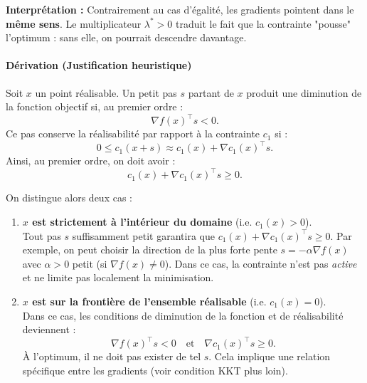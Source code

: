 \begin{figureexplanation}
\textbf{Interprétation :} Contrairement au cas d'égalité, les gradients pointent dans le \textbf{même sens}. Le multiplicateur $\lambda^* > 0$ traduit le fait que la contrainte "pousse" l'optimum : sans elle, on pourrait descendre davantage.
\end{figureexplanation}

\paragraph{Dérivation (Justification heuristique)}
Soit $x$ un point réalisable.
Un petit pas $s$ partant de $x$ produit une diminution de la fonction objectif si, au premier ordre :
\begin{equation}
    \nabla f(x)^\top s < 0.
\end{equation}
Ce pas conserve la réalisabilité par rapport à la contrainte $c_1$ si :
\begin{equation}
    0 \le c_1(x+s) \approx c_1(x) + \nabla c_1(x)^\top s.
\end{equation}
Ainsi, au premier ordre, on doit avoir :
\begin{equation}
    c_1(x) + \nabla c_1(x)^\top s \ge 0.
\end{equation}

On distingue alors deux cas :
\begin{enumerate}
    \item \textbf{$x$ est strictement à l'intérieur du domaine} (i.e. $c_1(x) > 0$). \\
    Tout pas $s$ suffisamment petit garantira que $c_1(x) + \nabla c_1(x)^\top s \ge 0$. Par exemple, on peut choisir la direction de la plus forte pente $s = -\alpha \nabla f(x)$ avec $\alpha > 0$ petit (si $\nabla f(x) \neq 0$). Dans ce cas, la contrainte n'est pas \textit{active} et ne limite pas localement la minimisation.
    
    \item \textbf{$x$ est sur la frontière de l'ensemble réalisable} (i.e. $c_1(x) = 0$). \\
    Dans ce cas, les conditions de diminution de la fonction et de réalisabilité deviennent :
    \begin{equation}
        \nabla f(x)^\top s < 0 \quad \text{et} \quad \nabla c_1(x)^\top s \ge 0.
    \end{equation}
    À l'optimum, il ne doit pas exister de tel $s$. Cela implique une relation spécifique entre les gradients (voir condition KKT plus loin).
\end{enumerate}



